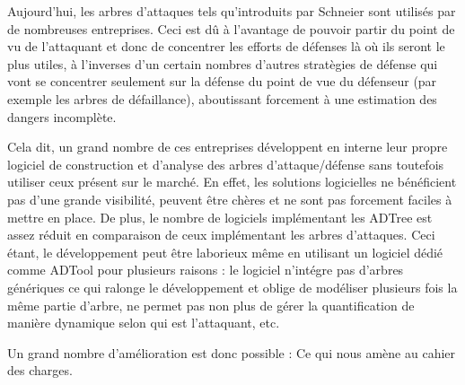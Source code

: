         Aujourd'hui, les arbres d'attaques tels qu'introduits par Schneier sont utilisés par de nombreuses entreprises. Ceci est dû à l'avantage de pouvoir partir du point de vu de l'attaquant et donc de concentrer les efforts de défenses là où ils seront le plus utiles, à l'inverses d'un certain nombres d'autres stratègies de défense qui vont se concentrer seulement sur la défense du point de vue du défenseur (par exemple les arbres de défaillance), aboutissant forcement à une estimation des dangers incomplète. 

        Cela dit, un grand nombre de ces entreprises développent en interne leur propre logiciel de construction et d'analyse des arbres d'attaque/défense sans toutefois utiliser ceux présent sur le marché. En effet, les solutions logicielles ne bénéficient pas d'une grande visibilité, peuvent être chères et ne sont pas forcement faciles à mettre en place. De plus, le nombre de logiciels implémentant les ADTree est assez réduit en comparaison de ceux implémentant les arbres d'attaques. Ceci étant, le développement peut être laborieux même en utilisant un logiciel dédié comme ADTool pour plusieurs raisons : le logiciel n'intégre pas d'arbres génériques ce qui ralonge le développement et oblige de modéliser plusieurs fois la même partie d'arbre, ne permet pas non plus de gérer la quantification de manière dynamique selon qui est l'attaquant, etc.

        Un grand nombre d'amélioration est donc possible : Ce qui nous amène au cahier des charges.


